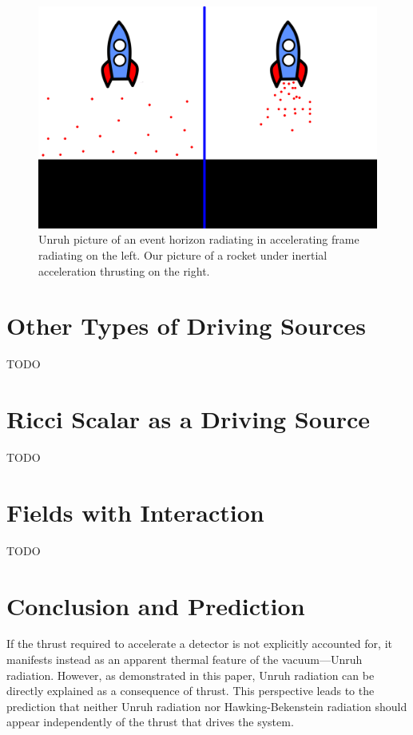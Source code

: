 \documentclass[12pt,a4paper]{article}
\begin{document}
\begin{figure}[h]
\centering
\includegraphics[scale=0.5]{rocket_inertial.png}
\caption{Unruh picture of an event horizon radiating in accelerating frame radiating on the left. Our picture of a rocket under inertial acceleration thrusting on the right.}
\label{rocket_inertial}
\end{figure}

\section{Other Types of Driving Sources}
TODO
\section{Ricci Scalar as a Driving Source}
TODO
\section{Fields with Interaction}
TODO

\section{Conclusion and Prediction}
If the thrust required to accelerate a detector is not explicitly accounted for, it manifests instead as an apparent thermal feature of the vacuum—Unruh radiation. However, as demonstrated in this paper, Unruh radiation can be directly explained as a consequence of thrust. This perspective leads to the prediction that neither Unruh radiation nor Hawking-Bekenstein radiation should appear independently of the thrust that drives the system.
\end{document}
